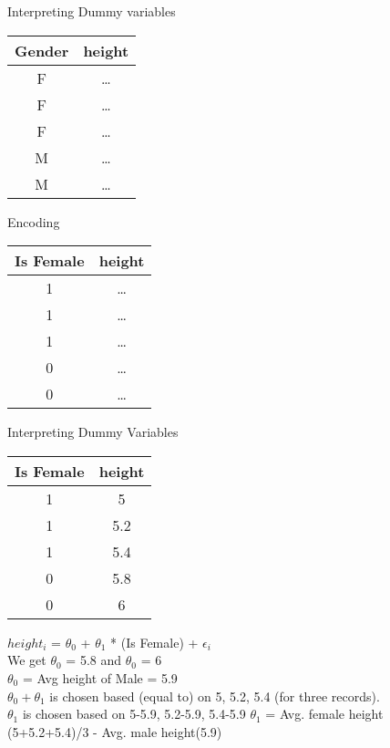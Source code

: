 \documentclass{beamer}
\begin{document}
\begin{frame}{Interpreting Dummy variables}
\begin{center}
\begin{tabular}{c|c}
Gender& height\\
\hline
\hline
F & \dots \\
F & \dots \\
F & \dots \\
M & \dots \\
M & \dots \\
\end{tabular}

\end{center}

\pause Encoding

\begin{center}
\pause \begin{tabular}{c|c}
Is Female& height\\
\hline
\hline
1 & \dots \\
1 & \dots \\
1 & \dots \\
0 & \dots \\
0 & \dots \\
\end{tabular}
\end{center}

\end{frame}

\begin{frame}{Interpreting Dummy Variables}
\begin{center}
	\pause \begin{tabular}{c|c}
		Is Female& height\\
		\hline
		\hline
		1 & 5 \\
		1 & 5.2 \\
		1 & 5.4 \\
		0 & 5.8 \\
		0 & 6 \\
	\end{tabular}
\end{center}
\pause $height_{i}$ = $\theta_{0}$ + $\theta_{1}$ *  (Is Female) + $\epsilon_{i}$\\
\vspace{1em}
\pause We get $\theta_0$ = 5.8 and $\theta_0$ = 6\\
\pause $\theta_{0}$ = Avg height of Male = 5.9\\
\pause $\theta_{0} + \theta_{1}$ is chosen based (equal to) on 5, 5.2, 5.4 (for three records). \\
\pause $\theta_{1}$ is chosen based on 5-5.9, 5.2-5.9, 5.4-5.9
\pause $\theta_{1}$ = Avg. female height (5+5.2+5.4)/3 - Avg. male height(5.9)
\end{frame}
\end{document}
